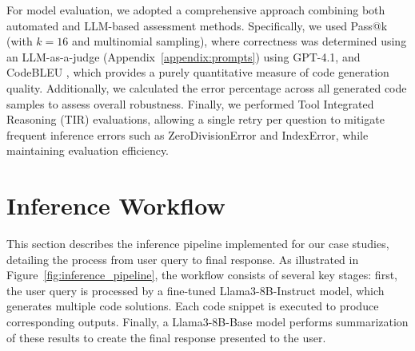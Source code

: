 For model evaluation, we adopted a comprehensive approach combining both automated and LLM-based assessment methods. Specifically, we used Pass@k \citep{Levi2024SimpleModelInferenceScalingLaws} (with $k=16$ and multinomial sampling), where correctness was determined using an LLM-as-a-judge \citep{Li2025LLMJudge} (Appendix~\ref{appendix:prompts}) using GPT-4.1, and CodeBLEU \citep{Ren2020CodeBLEU}, which provides a purely quantitative measure of code generation quality. Additionally, we calculated the error percentage across all generated code samples to assess overall robustness. Finally, we performed Tool Integrated Reasoning (TIR) \citep{Fleureau2024NuminaMath} evaluations, allowing a single retry per question to mitigate frequent inference errors such as ZeroDivisionError and IndexError, while maintaining evaluation efficiency.






\section{Inference Workflow}

This section describes the inference pipeline implemented for our case studies, detailing the process from user query to final response. As illustrated in Figure~\ref{fig:inference_pipeline}, the workflow consists of several key stages: first, the user query is processed by a fine-tuned Llama3-8B-Instruct model, which generates multiple code solutions. Each code snippet is executed to produce corresponding outputs. Finally, a Llama3-8B-Base model performs summarization of these results to create the final response presented to the user.


